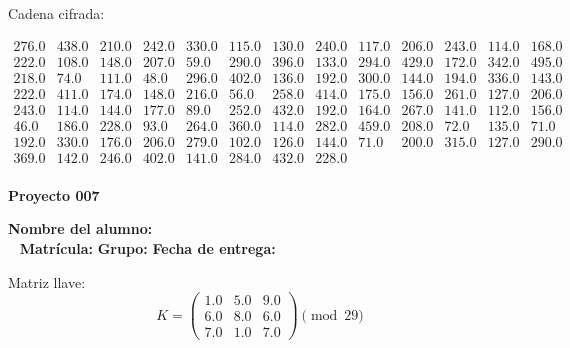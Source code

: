 \documentclass[12pt]{article}
\begin{document}
Cadena cifrada:
\begin{center}
$\begin{array}{lllllllllllll}
276.0 & 438.0 & 210.0 & 242.0 & 330.0 & 115.0 & 130.0 & 240.0 & 117.0 & 206.0 & 243.0 & 114.0 & 168.0\\
222.0 & 108.0 & 148.0 & 207.0 & 59.0 & 290.0 & 396.0 & 133.0 & 294.0 & 429.0 & 172.0 & 342.0 & 495.0\\
218.0 & 74.0 & 111.0 & 48.0 & 296.0 & 402.0 & 136.0 & 192.0 & 300.0 & 144.0 & 194.0 & 336.0 & 143.0\\
222.0 & 411.0 & 174.0 & 148.0 & 216.0 & 56.0 & 258.0 & 414.0 & 175.0 & 156.0 & 261.0 & 127.0 & 206.0\\
243.0 & 114.0 & 144.0 & 177.0 & 89.0 & 252.0 & 432.0 & 192.0 & 164.0 & 267.0 & 141.0 & 112.0 & 156.0\\
46.0 & 186.0 & 228.0 & 93.0 & 264.0 & 360.0 & 114.0 & 282.0 & 459.0 & 208.0 & 72.0 & 135.0 & 71.0\\
192.0 & 330.0 & 176.0 & 206.0 & 279.0 & 102.0 & 126.0 & 144.0 & 71.0 & 200.0 & 315.0 & 127.0 & 290.0\\
369.0 & 142.0 & 246.0 & 402.0 & 141.0 & 284.0 & 432.0 & 228.0\\
\end{array}$
\end{center}

\newpage


\textbf{Proyecto 007}

\textbf{Nombre del alumno:} \underline{\hspace{13cm}}\\\
\vspace{1cm}
\textbf{Matrícula:} \underline{\hspace{4cm}} \hspace{1cm}
\textbf{Grupo:} \underline{\hspace{2cm}}
\textbf{Fecha de entrega:} \underline{\hspace{2cm}}

\medskip

Matriz llave:
\[
K = \begin{pmatrix}
1.0 & 5.0 & 9.0\\
6.0 & 8.0 & 6.0\\
7.0 & 1.0 & 7.0
\end{pmatrix} \pmod{29}
\]
\end{document}
